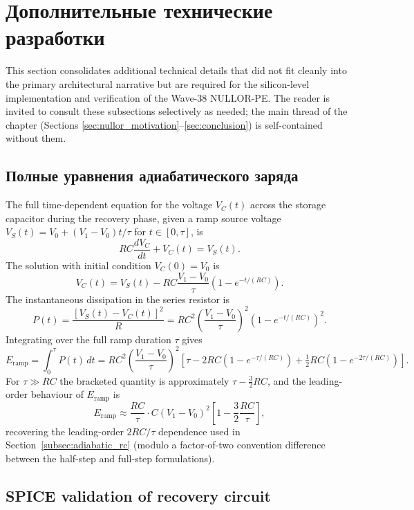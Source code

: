 \section{Дополнительные технические разработки}
\label{sec:additional}

This section consolidates additional technical details that did not fit cleanly into
the primary architectural narrative but are required for the silicon-level
implementation and verification of the Wave-38 NULLOR-PE.  The reader is invited to
consult these subsections selectively as needed; the main thread of the chapter
(Sections \ref{sec:nullor_motivation}--\ref{sec:conclusion}) is self-contained
without them.

\subsection{Полные уравнения адиабатического заряда}
\label{subsec:full_adiabatic}

The full time-dependent equation for the voltage $V_C(t)$ across the storage
capacitor during the recovery phase, given a ramp source voltage
$V_S(t) = V_0 + (V_1 - V_0) t / \tau$ for $t \in [0, \tau]$, is
\[
  R C \frac{dV_C}{dt} + V_C(t) = V_S(t).
\]
The solution with initial condition $V_C(0) = V_0$ is
\[
  V_C(t) = V_S(t) - R C \frac{V_1 - V_0}{\tau} \left(1 - e^{-t / (RC)}\right).
\]
The instantaneous dissipation in the series resistor is
\[
  P(t) = \frac{[V_S(t) - V_C(t)]^2}{R} =
  R C^2 \left(\frac{V_1 - V_0}{\tau}\right)^2 \left(1 - e^{-t/(RC)}\right)^2.
\]
Integrating over the full ramp duration $\tau$ gives
\[
  E_{\text{ramp}} = \int_0^\tau P(t) \, dt =
  R C^2 \left(\frac{V_1 - V_0}{\tau}\right)^2
  \left[\tau - 2 R C (1 - e^{-\tau/(RC)}) + \tfrac{1}{2} R C (1 - e^{-2\tau/(RC)})\right].
\]
For $\tau \gg RC$ the bracketed quantity is approximately $\tau - \frac{3}{2} R C$, and
the leading-order behaviour of $E_{\text{ramp}}$ is
\[
  E_{\text{ramp}} \approx \frac{R C}{\tau} \cdot C (V_1 - V_0)^2 \left[1 - \frac{3}{2} \frac{RC}{\tau}\right],
\]
recovering the leading-order $2 RC / \tau$ dependence used in
Section~\ref{subsec:adiabatic_rc} (modulo a factor-of-two convention difference
between the half-step and full-step formulations).

\subsection{SPICE validation of recovery circuit}
\label{subsec:spice}

